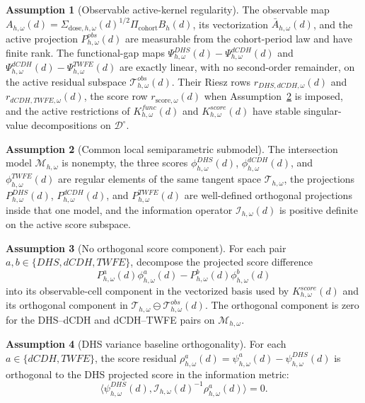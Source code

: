 \documentclass[11pt]{article}
\theoremstyle{definition}
\newtheorem{assumption}{Assumption}
\theoremstyle{plain}
\theoremstyle{remark}
\begin{document}
\begin{assumption}[Observable active-kernel regularity]\label{ass:kernel-regular}
The observable map \(A_{h,\omega}(d)=\Sigma_{\mathrm{dose},h,\omega}(d)^{1/2}\Pi_{\mathrm{cohort}}B_h(d)\), its vectorization \(\bar A_{h,\omega}(d)\), and the active projection \(P^{obs}_{h,\omega}(d)\) are measurable from the cohort-period law and have finite rank. The functional-gap maps \(\Psi^{DHS}_{h,\omega}(d)-\Psi^{dCDH}_{h,\omega}(d)\) and \(\Psi^{dCDH}_{h,\omega}(d)-\Psi^{TWFE}_{h,\omega}(d)\) are exactly linear, with no second-order remainder, on the active residual subspace \(\mathcal T^{obs}_{h,\omega}(d)\). Their Riesz rows \(r_{DHS,dCDH,\omega}(d)\) and \(r_{dCDH,TWFE,\omega}(d)\), the score row \(r_{\mathrm{score},\omega}(d)\) when Assumption~\ref{ass:common-submodel} is imposed, and the active restrictions of \(K^{func}_{h,\omega}(d)\) and \(K^{score}_{h,\omega}(d)\) have stable singular-value decompositions on \(\mathcal D^\circ\).
\end{assumption}

\begin{assumption}[Common local semiparametric submodel]\label{ass:common-submodel}
The intersection model \(\mathcal M_{h,\omega}\) is nonempty, the three scores \(\phi^{DHS}_{h,\omega}(d)\), \(\phi^{dCDH}_{h,\omega}(d)\), and \(\phi^{TWFE}_{h,\omega}(d)\) are regular elements of the same tangent space \(\mathcal T_{h,\omega}\), the projections \(P^{DHS}_{h,\omega}(d)\), \(P^{dCDH}_{h,\omega}(d)\), and \(P^{TWFE}_{h,\omega}(d)\) are well-defined orthogonal projections inside that one model, and the information operator \(\mathcal I_{h,\omega}(d)\) is positive definite on the active score subspace.
\end{assumption}

\begin{assumption}[No orthogonal score component]\label{ass:no-orthogonal-score}
For each pair \(a,b\in\{DHS,dCDH,TWFE\}\), decompose the projected score difference
\[
  P^a_{h,\omega}(d)\phi^a_{h,\omega}(d)-
  P^b_{h,\omega}(d)\phi^b_{h,\omega}(d)
\]
into its observable-cell component in the vectorized basis used by \(K^{score}_{h,\omega}(d)\) and its orthogonal component in \(\mathcal T_{h,\omega}\ominus\mathcal T^{obs}_{h,\omega}(d)\). The orthogonal component is zero for the DHS--dCDH and dCDH--TWFE pairs on \(\mathcal M_{h,\omega}\).
\end{assumption}

\begin{assumption}[DHS variance baseline orthogonality]\label{ass:variance-baseline}
For each \(a\in\{dCDH,TWFE\}\), the score residual \(\rho^a_{h,\omega}(d)=\psi^a_{h,\omega}(d)-\psi^{DHS}_{h,\omega}(d)\) is orthogonal to the DHS projected score in the information metric:
\[
  \langle\psi^{DHS}_{h,\omega}(d),
    \mathcal I_{h,\omega}(d)^{-1}\rho^a_{h,\omega}(d)\rangle=0.
\]
\end{assumption}
\end{document}
